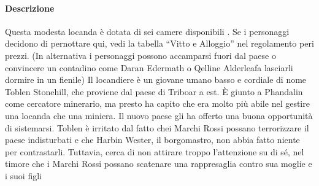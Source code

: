 \documentclass{article}
\begin{document}
\paragraph{Descrizione}
Questa modesta locanda è dotata di sei camere disponibili
. Se i personaggi decidono
di pernottare qui, vedi la tabella “Vitto e Alloggio” nel
regolamento peri prezzi. (In alternativa i personaggi possono
accamparsi fuori dal paese o convincere un contadino come
Daran Edermath o Qelline Alderleafa lasciarli dormire
in un fienile)
Il locandiere è un giovane umano basso e cordiale di nome
Toblen Stonehill, che proviene dal paese di Triboar a est.
È giunto a Phandalin come cercatore minerario, ma presto
ha capito che era molto più abile nel gestire una locanda
che una miniera. Il nuovo paese gli ha offerto una buona
opportunità di sistemarsi. Toblen è irritato dal fatto chei
Marchi Rossi possano terrorizzare il paese indisturbati e
che Harbin Wester, il borgomastro, non abbia fatto niente per
contrastarli. Tuttavia, cerca di non attirare troppo l’attenzione
su di sé, nel timore che i Marchi Rossi possano scatenare una
rappresaglia contro sua moglie e i suoi figli
\end{document}

